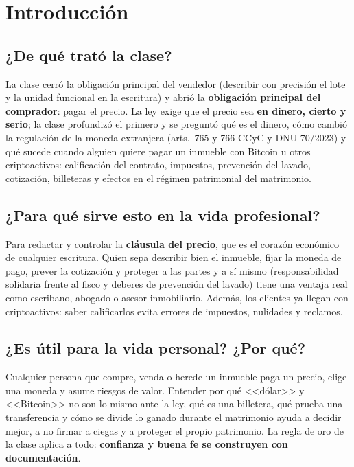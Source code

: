 \documentclass[12pt,oneside,a4paper]{book}
\begin{document}
\chapter*{Introducción}

\section{¿De qué trató la clase?}

La clase cerró la obligación principal del vendedor (describir con precisión el lote y la unidad funcional en la escritura) y abrió la \textbf{obligación principal del comprador}: pagar el precio. La ley exige que el precio sea \textbf{en dinero, cierto y serio}; la clase profundizó el primero y se preguntó qué es el dinero, cómo cambió la regulación de la moneda extranjera (arts.~765 y 766 CCyC y DNU 70/2023) y qué sucede cuando alguien quiere pagar un inmueble con Bitcoin u otros criptoactivos: calificación del contrato, impuestos, prevención del lavado, cotización, billeteras y efectos en el régimen patrimonial del matrimonio.

\section{¿Para qué sirve esto en la vida profesional?}

Para redactar y controlar la \textbf{cláusula del precio}, que es el corazón económico de cualquier escritura. Quien sepa describir bien el inmueble, fijar la moneda de pago, prever la cotización y proteger a las partes y a sí mismo (responsabilidad solidaria frente al fisco y deberes de prevención del lavado) tiene una ventaja real como escribano, abogado o asesor inmobiliario. Además, los clientes ya llegan con criptoactivos: saber calificarlos evita errores de impuestos, nulidades y reclamos.

\section{¿Es útil para la vida personal? ¿Por qué?}

Cualquier persona que compre, venda o herede un inmueble paga un precio, elige una moneda y asume riesgos de valor. Entender por qué <<dólar>> y <<Bitcoin>> no son lo mismo ante la ley, qué es una billetera, qué prueba una transferencia y cómo se divide lo ganado durante el matrimonio ayuda a decidir mejor, a no firmar a ciegas y a proteger el propio patrimonio. La regla de oro de la clase aplica a todo: \textbf{confianza y buena fe se construyen con documentación}.
\end{document}
